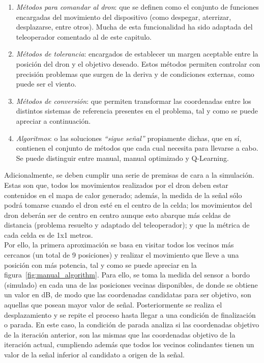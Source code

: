 \begin{enumerate}
	\item \emph{Métodos para comandar al dron}: que se definen como el conjunto de funciones encargadas del movimiento del dispositivo (como despegar, aterrizar, desplazarse, entre otros). Mucha de esta funcionalidad ha sido adaptada del teleoperador comentado al de este capitulo.
    \item \emph{Métodos de tolerancia}: encargados de establecer un margen aceptable entre la posición del dron y el objetivo deseado. Estos métodos permiten controlar con precisión problemas que surgen de la deriva y de condiciones externas, como puede ser el viento.
	\item \emph{Métodos de conversión}: que permiten transformar las coordenadas entre los distintos sistemas de referencia presentes en el problema, tal y como se puede apreciar a continuación.
    \item \emph{Algoritmos}: o las soluciones \emph{``sigue señal''} propiamente dichas, que en sí, contienen el conjunto de métodos que cada cual necesita para llevarse a cabo. Se puede distinguir entre manual, manual optimizado y Q-Learning.
\end{enumerate}

Adicionalmente, se deben cumplir una serie de premisas de cara a la simulación. Estas son que, todos los movimientos realizados por el dron deben estar contenidos en el mapa de calor generado; además, la medida de la señal sólo podrá tomarse cuando el dron esté en el centro de la celda; los movimientos del dron deberán ser de centro en centro aunque esto abarque más celdas de distancia (problema resuelto y adaptado del teleoperador); y que la métrica de cada celda es de 1x1 metros.\\

Por ello, la primera aproximación se basa en visitar todos los vecinos más cercanos (un total de 9 posiciones) y realizar el movimiento que lleve a una posición con más potencia, tal y como se puede apreciar en la figura~\ref{fig:manual_algorithm}. Para ello, se toma la medida del sensor a bordo (simulado) en cada una de las posiciones vecinas disponibles, de donde se obtiene un valor en dB, de modo que las coordenadas candidatas para ser objetivo, son aquellas que posean mayor valor de señal. Posteriormente se realiza el desplazamiento y se repite el proceso hasta llegar a una condición de finalización o parada. En este caso, la condición de parada analiza si las coordenadas objetivo de la iteración anterior, son las mismas que las coordenadas objetivo de la iteración actual, cumpliendo además que todos los vecinos colindantes tienen un valor de la señal inferior al candidato a origen de la señal.\\

